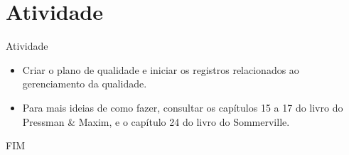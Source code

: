 \documentclass{beamer}
\begin{document}
\section{Atividade}

\begin{frame}{Atividade}
    \begin{itemize}
        \justifying
        \item Criar o plano de qualidade e iniciar os registros relacionados ao gerenciamento da qualidade.
        \item Para mais ideias de como fazer, consultar os capítulos 15 a 17 do livro do Pressman \& Maxim, e o capítulo 24 do livro do Sommerville.
    \end{itemize}
\end{frame}



\begin{frame}
    \centering
    \Large
    FIM
\end{frame}
    
\end{document}
